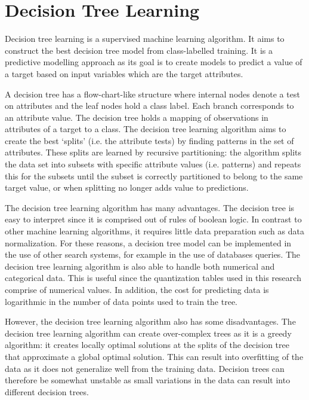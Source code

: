 \section{Decision Tree Learning}\label{sec:dt}

Decision tree learning is a supervised machine learning algorithm. It aims to construct the best decision tree model from class-labelled training. It is a predictive modelling approach as its goal is to create models to predict a value of a target based on input variables which are the target attributes.

A decision tree has a flow-chart-like structure where internal nodes denote a test on attributes and the leaf nodes hold a class label. Each branch corresponds to an attribute value. The decision tree holds a mapping of observations in attributes of a target to a class. The decision tree learning algorithm aims to create the best `splits' (i.e. the attribute tests) by finding patterns in the set of attributes. These splits are learned by recursive partitioning: the algorithm splits the data set into subsets with specific attribute values (i.e. patterns) and repeats this for the subsets until the subset is correctly partitioned to belong to the same target value, or when splitting no longer adds value to predictions.

The decision tree learning algorithm has many advantages. The decision tree is easy to interpret since it is comprised out of rules of boolean logic. In contrast to other machine learning algorithms, it requires little data preparation such as data normalization. For these reasons, a decision tree model can be implemented in the use of other search systems, for example in the use of databases queries. The decision tree learning algorithm is also able to handle both numerical and categorical data. This is useful since the quantization tables used in this research comprise of numerical values. In addition, the cost for predicting data is logarithmic in the number of data points used to train the tree. 

However, the decision tree learning algorithm also has some disadvantages. The decision tree learning algorithm can create over-complex trees as it is a greedy algorithm: it creates locally optimal solutions at the splits of the decision tree that approximate a global optimal solution. This can result into overfitting of the data as it does not generalize well from the training data. Decision trees can therefore be somewhat unstable as small variations in the data can result into different decision trees. 

